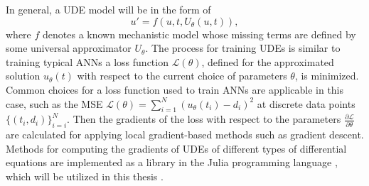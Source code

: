 In general, a \gls{UDE} model will be in the form of \cite{rackauckasUniversalDifferentialEquations2020}
\begin{equation}
    u' = f(u, t, U_\theta(u, t)),
\end{equation}
where $f$ denotes a known mechanistic model whose missing terms are defined by some universal approximator $U_\theta$.
The process for training \glspl{UDE} is similar to training typical \glspl{ANN} a loss function $\mathcal{L}(\theta)$, defined for the approximated solution $u_\theta(t)$ with respect to the current choice of parameters $\theta$, is minimized.
Common choices for a loss function used to train \glspl{ANN} are applicable in this case, such as the \gls{MSE} $\mathcal{L}(\theta) = \sum_{i=1}^{N} (u_\theta(t_i) - d_i)^2$ at discrete data points $\{(t_i, d_i)\}_{i=i}^N$.
Then the gradients of the loss with respect to the parameters $\frac{\partial\mathcal{L}}{\partial\theta}$ are calculated for applying local gradient-based methods such as gradient descent.
Methods for computing the gradients of \glspl{UDE} of different types of differential equations are implemented as a library in the Julia programming language \cite{bezanson2012julia}, which will be utilized in this thesis \cite{rackauckasUniversalDifferentialEquations2020}.